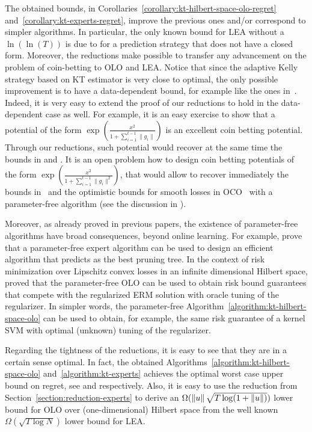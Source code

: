 The obtained bounds, in Corollaries~\ref{corollary:kt-hilbert-space-olo-regret}
and~\ref{corollary:kt-experts-regret}, improve the previous ones and/or
correspond to simpler algorithms.  In particular, the only known bound for
\ac{LEA} without a $\ln(\ln(T))$ is due to \citet{ChernovV10} for a prediction
strategy that does not have a closed form.  Moreover, the reductions make
possible to transfer any advancement on the problem of coin-betting to \ac{OLO}
and \ac{LEA}. Notice that since the adaptive Kelly strategy based on \ac{KT}
estimator is very close to optimal, the only possible improvement is to have a
data-dependent bound, for example like the ones in~\cite{KoolenE15}. Indeed, it
is very easy to extend the proof of our reductions to hold in the
data-dependent case as well. For example, it is an easy exercise to show that a
potential of the form $\exp \left(\frac{x^2}{1+\sum_{i=1}^{t-1}
\|g_{i}\|}\right)$ is an excellent coin betting potential. Through our
reductions, such potential would recover at the same time the bounds in
\citet{LuoS15} and \citet{Orabona14}. It is an open problem how to design coin
betting potentials of the form $\exp \left(\frac{x^2}{1+\sum_{i=1}^{t-1}
\|g_{i}\|^2}\right)$, that would allow to recover immediately the bounds
in~\citet{KoolenE15} and the optimistic bounds for smooth losses in
\ac{OCO}~\citep{SrebroST10} with a parameter-free algorithm (see the discussion
in \citet{Orabona14}).

Moreover, as already proved in previous papers, the existence of parameter-free
algorithms have broad consequences, beyond online learning. For example,
\citet{LuoS15} prove that a parameter-free expert algorithm can be used to
design an efficient algorithm that predicts as the best pruning tree. In the
context of risk minimization over Lipschitz convex losses in an infinite
dimensional Hilbert space, \citet{Orabona14} proved that the parameter-free
\ac{OLO} can be used to obtain risk bound guarantees that compete with the
regularized \acl{ERM} solution with oracle tuning of the regularizer. In
simpler words, the parameter-free
Algorithm~\ref{algorithm:kt-hilbert-space-olo} can be used to obtain, for
example, the same risk guarantee of a kernel \acl{SVM} with optimal (unknown)
tuning of the regularizer.

Regarding the tightness of the reductions, it is easy to see that they are in a
certain sense optimal. In fact, the obtained
Algorithms~\ref{algorithm:kt-hilbert-space-olo} and~\ref{algorithm:kt-experts}
achieves the optimal worst case upper bound on regret, see \citet{Orabona13} and
\citet{Cesa-BianchiL06} respectively. Also, it is easy to use the  reduction
from Section~\ref{section:reduction-experts} to derive an $\Omega(\left\|{u}\right\|
\sqrt{T\log(1+\left\|{u}\right\|)})$ lower bound for \ac{OLO} over (one-dimensional)
Hilbert space from the well known $\Omega(\sqrt{T \log N})$ lower bound for
\ac{LEA}.
